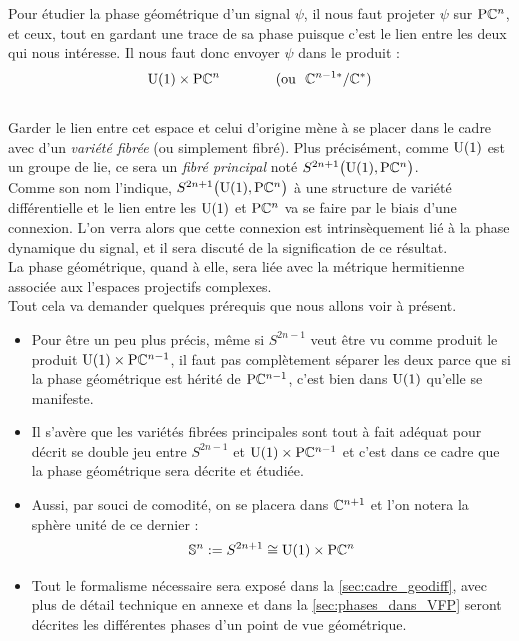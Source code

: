 
 Pour étudier la phase géométrique d'un signal $\psi$, il nous faut projeter $\psi$ sur $\text{\normalfont P}\mathbb{C}^{n}$, et ceux, tout en gardant une trace de sa phase puisque c'est le lien entre les deux qui nous intéresse. Il nous faut donc envoyer $\psi$ dans le produit :
\[\text{\normalfont U}(1)\times \text{\normalfont P}\mathbb{C}^{n}\qquad\qquad (\text{ou }\ \mathbb{C}^{n-1*}/\mathbb{C}^*)\]
\\
Garder le lien entre cet espace et celui d'origine mène à se placer dans le cadre avec d'un \emph{variété fibrée} (ou simplement fibré). Plus précisément, comme $\text{\normalfont U}(1)$ est un groupe de lie, ce sera un \emph{fibré principal} noté $S^{2n+1}\big(\text{\normalfont U}(1),\text{\normalfont P}\mathbb{C}^{n}\big)$.
\\

Comme son nom l'indique, $S^{2n+1}\big(\text{\normalfont U}(1),\text{\normalfont P}\mathbb{C}^{n}\big)$ à une structure de variété différentielle et le lien entre les $\text{\normalfont U}(1)$ et $\text{\normalfont P}\mathbb{C}^{n}$ va se faire par le biais d'une connexion. L'on verra alors que cette connexion est intrinsèquement lié à la phase dynamique du signal, et il sera discuté de la signification de ce résultat.
\\
La phase géométrique, quand à elle, sera liée avec la métrique hermitienne associée aux l'espaces projectifs complexes.
\\
Tout cela va demander quelques prérequis que nous allons voir à présent.
\\

\begin{itemize}
	\item Pour être un peu plus précis, même si $S^{2n-1}$ veut être vu comme produit le produit $\text{\normalfont U}(1)\times \text{\normalfont P}\mathbb{C}^{n-1}$, il faut pas complètement séparer les deux parce que si la phase géométrique est hérité de $\text{\normalfont P}\mathbb{C}^{n-1}$, c'est bien dans $\text{\normalfont U}(1)$ qu'elle se manifeste.
	
	\item Il s'avère que les variétés fibrées principales sont tout à fait adéquat pour décrit se double jeu entre $S^{2n-1}$ et $\text{\normalfont U}(1)\times \text{\normalfont P}\mathbb{C}^{n-1}$ et c'est dans ce cadre que la phase géométrique sera décrite et étudiée.
	
	\item Aussi, par souci de comodité, on se placera dans $\mathbb{C}^{n+1}$ et l'on notera la sphère unité de ce dernier :
	\[\mathbb{ S}^{n} := S^{2n+1} \cong \text{\normalfont U}(1)\times \text{\normalfont P}\mathbb{C}^{n}\]
	
	\item Tout le formalisme nécessaire sera exposé dans la \cref{sec:cadre_geodiff}, avec plus de détail technique en annexe et dans la \cref{sec:phases_dans_VFP} seront décrites les différentes phases d'un point de vue géométrique.
	
\end{itemize}



